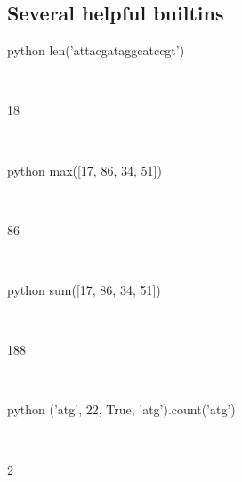 \documentclass[aspectratio=1610,slidestop]{beamer}
\begin{document}
\subsection{Several helpful builtins}
\begin{pframe}
 \begin{ipython}
  \begin{pythonin}{python}
len('attacgataggcatccgt')
  \end{pythonin}
  \\
  \begin{pythonout}
18
  \end{pythonout}
  \\

  \begin{pythonin}{python}
max([17, 86, 34, 51])
  \end{pythonin}
  \\
  \begin{pythonout}
86
  \end{pythonout}
  \\

  \begin{pythonin}{python}
sum([17, 86, 34, 51])
  \end{pythonin}
  \\
  \begin{pythonout}
188
  \end{pythonout}
  \\

  \begin{pythonin}{python}
('atg', 22, True, 'atg').count('atg')
  \end{pythonin}
  \\
  \begin{pythonout}
2
  \end{pythonout}
 \end{ipython}
\end{pframe}
\end{document}
